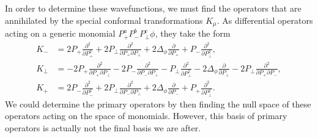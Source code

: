 In order to determine these wavefunctions, we must find the operators that are 
annihilated by the special conformal transformations $K_\mu$. As differential 
operators acting on a generic monomial $P_+^a P_-^b P_\bot^c \phi$, they take 
the form 
\begin{equation}
    \begin{aligned}
        K_- &= 2P_+ \frac{\partial^2}{\partial P_+^2} + 2 P_\bot \frac{\partial^2}{\partial P_+ \partial P_\bot} + 2\Delta_\phi \frac{\partial}{\partial P_+} + P_- \frac{\partial^2}{\partial P_\bot^2}, \\
        K_\bot &= -2P_+ \frac{\partial^2}{\partial P_+ \partial P_\bot} - 2P_-\frac{\partial^2}{\partial P_- \partial P_\bot} - P_\bot \frac{\partial^2}{\partial P_\bot^2} - 2\Delta_\phi \frac{\partial}{\partial P_\bot} - 2 P_\bot \frac{\partial^2}{\partial P_+ \partial P_-}, \\
        K_+ &= 2P_- \frac{\partial^2}{\partial P_-^2} + 2P_\bot \frac{\partial^2}{\partial P_- \partial P_\bot} + 2\Delta_\phi \frac{\partial}{\partial P_-} + P_+ \frac{\partial^2}{\partial P_\bot^2}.
    \end{aligned}
\end{equation} 
We could determine the primary operators by then finding the null space of these 
operators acting on the space of monomials. However, this basis of primary 
operators is actually not the final basis we are after.


